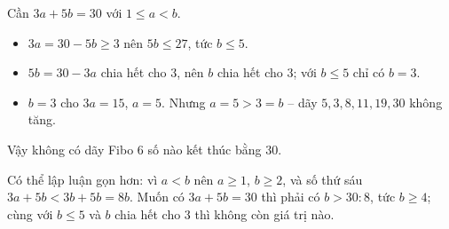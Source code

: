 {
Cần $3a+5b=30$ với $1\le a<b$.
\begin{itemize}[leftmargin=1.3em,itemsep=1pt]
\item $3a=30-5b\ge 3$ nên $5b\le 27$, tức $b\le 5$.
\item $5b=30-3a$ chia hết cho $3$, nên $b$ chia hết cho $3$; với $b\le 5$ chỉ có $b=3$.
\item $b=3$ cho $3a=15$, $a=5$. Nhưng $a=5>3=b$ -- dãy $5,3,8,11,19,30$ không tăng.
\end{itemize}
Vậy không có dãy Fibo $6$ số nào kết thúc bằng $30$.
\begin{proofbox}Có thể lập luận gọn hơn: vì $a<b$ nên $a\ge 1$, $b\ge 2$, và số thứ sáu $3a+5b<3b+5b=8b$. Muốn có $3a+5b=30$ thì phải có $b>30:8$, tức $b\ge 4$; cùng với $b\le 5$ và $b$ chia hết cho $3$ thì không còn giá trị nào.\end{proofbox}
}

